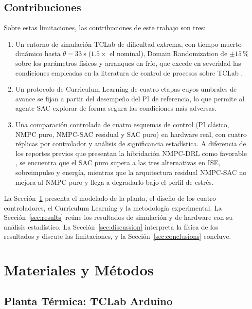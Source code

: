 \documentclass[processes,article,submit,moreauthors,pdftex]{Definitions/mdpi}
\begin{document}
\subsection{Contribuciones}

Sobre estas limitaciones, las contribuciones de este trabajo son tres:
\begin{enumerate}
  \item Un entorno de simulación TCLab de dificultad extrema, con tiempo
  muerto dinámico hasta $\theta = \SI{33}{\second}$ ($1.5\times$ el nominal),
  Domain Randomization de $\pm 15\,\%$ sobre los parámetros físicos y
  arranques en frío, que excede en severidad las condiciones empleadas en la
  literatura de control de procesos sobre TCLab \cite{SozaMamani2025}.
  \item Un protocolo de Curriculum Learning de cuatro etapas cuyos umbrales
  de avance se fijan a partir del desempeño del PI de referencia, lo que
  permite al agente SAC explorar de forma segura las condiciones más adversas.
  \item Una comparación controlada de cuatro esquemas de control (PI clásico,
  NMPC puro, NMPC-SAC residual y SAC puro) en hardware real, con cuatro
  réplicas por controlador y análisis de significancia estadística. A
  diferencia de los reportes previos que presentan la hibridación NMPC-DRL
  como favorable \cite{SozaMamani2025,Hosseinionari2024}, se encuentra que el
  SAC puro supera a las tres alternativas en ISE, sobreimpulso y energía,
  mientras que la arquitectura residual NMPC-SAC no mejora al NMPC puro y
  llega a degradarlo bajo el perfil de estrés.
\end{enumerate}

La Sección~\ref{sec:methods} presenta el modelado de la planta, el diseño de
los cuatro controladores, el Curriculum Learning y la metodología
experimental. La Sección~\ref{sec:results} reúne los resultados de simulación
y de hardware con su análisis estadístico. La Sección~\ref{sec:discussion}
interpreta la física de los resultados y discute las limitaciones, y la
Sección~\ref{sec:conclusions} concluye.


\section{Materiales y Métodos}
\label{sec:methods}

\subsection{Planta Térmica: TCLab Arduino}
\label{subsec:plant}
\end{document}
